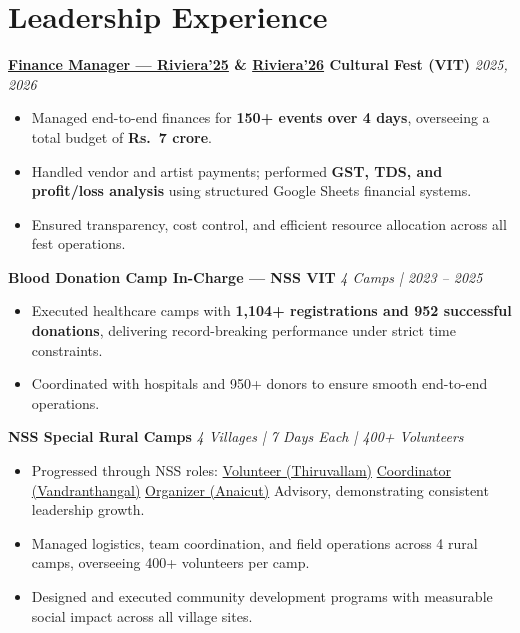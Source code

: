 \documentclass[10pt, a4paper]{article}
\newcommand{\roleentry}[2]{%
  \textbf{#1} \hfill \textit{#2}%
}
\newenvironment{rlist}{%
  \begin{itemize}[
    leftmargin=1.4em,
    itemsep=1.5pt,
    parsep=0pt,
    topsep=2pt,
    label=\textcolor{accentNavy}{\textbullet}
  ]
}{\end{itemize}}
\begin{document}
\section{Leadership Experience}

\roleentry{\href{https://drive.google.com/file/d/105dvzQLrqjc5R0gqat4RoE0UaWKLDS8_/view?usp=sharing}{Finance Manager --- Riviera'25} \& \href{https://drive.google.com/file/d/159EJQLYjJXA7spIEIw-ZPYe1tM9Xellc/view?usp=sharing}{Riviera'26} Cultural Fest (VIT)}{2025, 2026}
\begin{rlist}
  \item Managed end-to-end finances for \textbf{150+ events over 4 days}, overseeing a total budget of \textbf{Rs.\ 7 crore}.
  \item Handled vendor and artist payments; performed \textbf{GST, TDS, and profit/loss analysis} using structured Google Sheets financial systems.
  \item Ensured transparency, cost control, and efficient resource allocation across all fest operations.
\end{rlist}

\vspace{4pt}

\roleentry{Blood Donation Camp In-Charge --- NSS VIT}{4 Camps | 2023 -- 2025}
\begin{rlist}
  \item Executed healthcare camps with \textbf{1,104+ registrations and 952 successful donations}, delivering record-breaking performance under strict time constraints.
  \item Coordinated with hospitals and 950+ donors to ensure smooth end-to-end operations.
\end{rlist}

\vspace{4pt}

\roleentry{NSS Special Rural Camps}{4 Villages | 7 Days Each | 400+ Volunteers}
\begin{rlist}
  \item Progressed through NSS roles:
    \href{https://drive.google.com/file/d/13_4x3JMNtPtUulgd1ZAJB5clVbOgFmPs/view?usp=sharing}{Volunteer (Thiruvallam)}
    \textrightarrow{}
    \href{https://drive.google.com/file/d/13VtTA_-B_5-ayLEPOsn2vwrATXAS3lrH/view?usp=sharing}{Coordinator (Vandranthangal)}
    \textrightarrow{}
    \href{https://drive.google.com/file/d/13RI6Hox2c5HpU-Qo5WOvDUNUdHpwx-6F/view?usp=sharing}{Organizer (Anaicut)}
    \textrightarrow{} Advisory, demonstrating consistent leadership growth.
  \item Managed logistics, team coordination, and field operations across 4 rural camps, overseeing 400+ volunteers per camp.
  \item Designed and executed community development programs with measurable social impact across all village sites.
\end{rlist}
\end{document}

